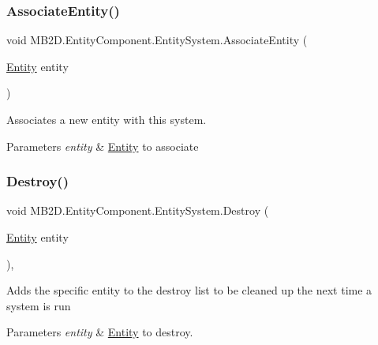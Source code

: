 \subsubsection{\texorpdfstring{Associate\+Entity()}{AssociateEntity()}}
{\footnotesize\ttfamily void M\+B2\+D.\+Entity\+Component.\+Entity\+System.\+Associate\+Entity (\begin{DoxyParamCaption}\item[{\hyperlink{class_m_b2_d_1_1_entity_component_1_1_entity}{Entity}}]{entity }\end{DoxyParamCaption})\hspace{0.3cm}{\ttfamily [inline]}}



Associates a new entity with this system. 


\begin{DoxyParams}{Parameters}
{\em entity} & \hyperlink{class_m_b2_d_1_1_entity_component_1_1_entity}{Entity} to associate\\
\hline
\end{DoxyParams}
\hypertarget{class_m_b2_d_1_1_entity_component_1_1_entity_system_a86f27e2e12da562903092d5afb9dd70d}{}\label{class_m_b2_d_1_1_entity_component_1_1_entity_system_a86f27e2e12da562903092d5afb9dd70d} 
\subsubsection{\texorpdfstring{Destroy()}{Destroy()}}
{\footnotesize\ttfamily void M\+B2\+D.\+Entity\+Component.\+Entity\+System.\+Destroy (\begin{DoxyParamCaption}\item[{\hyperlink{class_m_b2_d_1_1_entity_component_1_1_entity}{Entity}}]{entity }\end{DoxyParamCaption})\hspace{0.3cm}{\ttfamily [inline]}, {\ttfamily [protected]}}



Adds the specific entity to the destroy list to be cleaned up the next time a system is run 


\begin{DoxyParams}{Parameters}
{\em entity} & \hyperlink{class_m_b2_d_1_1_entity_component_1_1_entity}{Entity} to destroy.\\
\hline
\end{DoxyParams}
\hypertarget{class_m_b2_d_1_1_entity_component_1_1_entity_system_ae8d1330e220d3ae7c8f6640c5d4aacd0}{}\label{class_m_b2_d_1_1_entity_component_1_1_entity_system_ae8d1330e220d3ae7c8f6640c5d4aacd0} 
